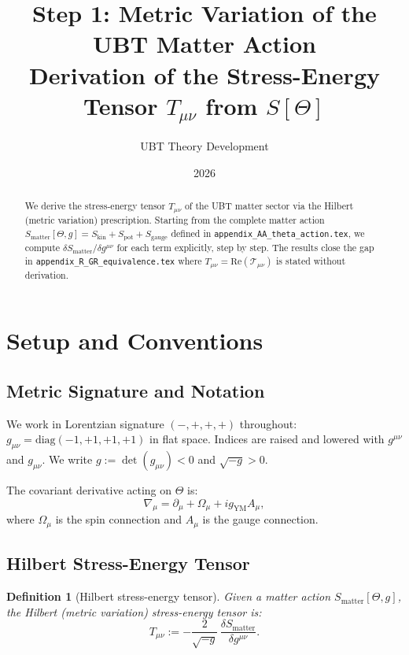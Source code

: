 \documentclass[12pt]{article}
\title{Step 1: Metric Variation of the UBT Matter Action\\
\large Derivation of the Stress-Energy Tensor $T_{\mu\nu}$ from $S[\Theta]$}
\author{UBT Theory Development}
\date{2026}
\newtheorem{definition}{Definition}[section]
\begin{document}
\maketitle

\begin{abstract}
We derive the stress-energy tensor $T_{\mu\nu}$ of the UBT matter sector via the
Hilbert (metric variation) prescription.  Starting from the complete matter action
$S_{\mathrm{matter}}[\Theta, g] = S_{\mathrm{kin}} + S_{\mathrm{pot}} +
S_{\mathrm{gauge}}$ defined in \texttt{appendix\_AA\_theta\_action.tex}, we
compute $\delta S_{\mathrm{matter}}/\delta g^{\mu\nu}$ for each term explicitly,
step by step.  The results close the gap in
\texttt{appendix\_R\_GR\_equivalence.tex} where $T_{\mu\nu} = \mathrm{Re}(\mathcal{T}_{\mu\nu})$
is stated without derivation.
\end{abstract}

\tableofcontents

\section{Setup and Conventions}

\subsection{Metric Signature and Notation}

We work in Lorentzian signature $(-,+,+,+)$ throughout:
$g_{\mu\nu} = \mathrm{diag}(-1,+1,+1,+1)$ in flat space.
Indices are raised and lowered with $g^{\mu\nu}$ and $g_{\mu\nu}$.
We write $g := \det(g_{\mu\nu}) < 0$ and $\sqrt{-g} > 0$.

The covariant derivative acting on $\Theta$ is:
\begin{equation}
  \nabla_\mu = \partial_\mu + \Omega_\mu + i g_{\mathrm{YM}} A_\mu,
\end{equation}
where $\Omega_\mu$ is the spin connection and $A_\mu$ is the gauge connection.

\subsection{Hilbert Stress-Energy Tensor}

\begin{definition}[Hilbert stress-energy tensor]
\label{def:hilbert}
Given a matter action $S_{\mathrm{matter}}[\Theta, g]$, the
\emph{Hilbert (metric variation) stress-energy tensor} is:
\begin{equation}
  \label{eq:hilbert}
  T_{\mu\nu} := -\frac{2}{\sqrt{-g}}\,
    \frac{\delta S_{\mathrm{matter}}}{\delta g^{\mu\nu}}.
\end{equation}
\end{definition}
\end{document}
